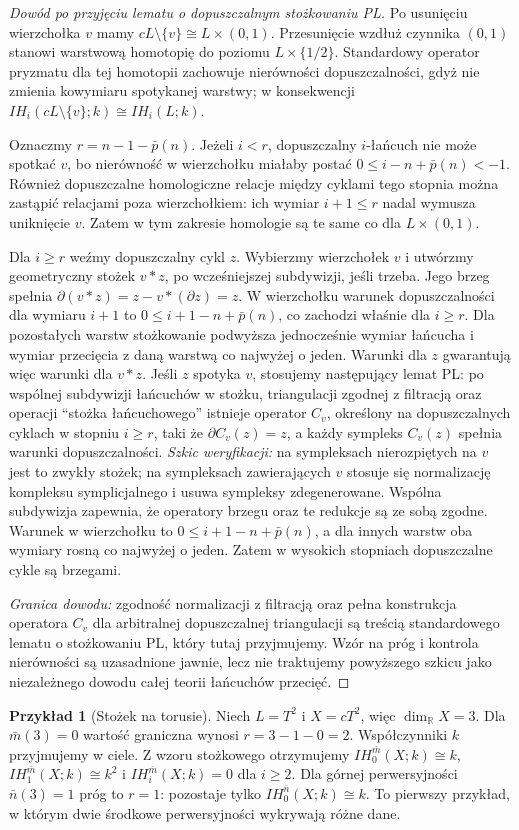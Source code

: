\documentclass[11pt,a4paper,oneside]{report}
\newcommand{\R}{\mathbb{R}}
\theoremstyle{plain}
\theoremstyle{definition}
\newtheorem{przyklad}[twierdzenie]{Przykład}
\theoremstyle{remark}
\begin{document}
\begin{proof}[Dowód po przyjęciu lematu o dopuszczalnym stożkowaniu PL]
Po usunięciu wierzchołka $v$ mamy
$cL\setminus\{v\}\cong L\times(0,1)$.
Przesunięcie wzdłuż czynnika $(0,1)$ stanowi
warstwową homotopię do poziomu $L\times\{1/2\}$.
Standardowy operator pryzmatu dla tej homotopii
zachowuje nierówności dopuszczalności, gdyż nie
zmienia kowymiaru spotykanej warstwy; w konsekwencji
$IH_i(cL\setminus\{v\};k)\cong IH_i(L;k)$.

Oznaczmy $r=n-1-\bar p(n)$.
Jeżeli $i<r$, dopuszczalny $i$-łańcuch nie może
spotkać $v$, bo nierówność w wierzchołku miałaby
postać $0\le i-n+\bar p(n)<-1$.
Również dopuszczalne homologiczne relacje między
cyklami tego stopnia można zastąpić relacjami poza
wierzchołkiem: ich wymiar $i+1\le r$ nadal wymusza
uniknięcie $v$. Zatem w tym zakresie homologie są
te same co dla $L\times(0,1)$.

Dla $i\ge r$ weźmy dopuszczalny cykl $z$.
Wybierzmy wierzchołek $v$ i utwórzmy geometryczny
stożek $v*z$, po wcześniejszej subdywizji, jeśli
trzeba. Jego brzeg spełnia
$\partial(v*z)=z-v*(\partial z)=z$.
W wierzchołku warunek dopuszczalności dla wymiaru
$i+1$ to $0\le i+1-n+\bar p(n)$, co zachodzi
właśnie dla $i\ge r$. Dla pozostałych warstw
stożkowanie podwyższa jednocześnie wymiar łańcucha
i wymiar przecięcia z daną warstwą co najwyżej
o jeden. Warunki dla $z$ gwarantują więc warunki
dla $v*z$. Jeśli $z$ spotyka $v$, stosujemy następujący
lemat PL: po wspólnej subdywizji łańcuchów w
stożku, triangulacji zgodnej z filtracją oraz
operacji ``stożka łańcuchowego'' istnieje operator
$C_v$, określony na dopuszczalnych cyklach w
stopniu $i\ge r$, taki że
$\partial C_v(z)=z$, a każdy sympleks $C_v(z)$
spełnia warunki dopuszczalności. \emph{Szkic weryfikacji:}
na sympleksach nierozpiętych na $v$ jest to zwykły
stożek; na sympleksach zawierających $v$ stosuje się
normalizację kompleksu symplicjalnego i usuwa
sympleksy zdegenerowane. Wspólna subdywizja
zapewnia, że operatory brzegu oraz te redukcje
są ze sobą zgodne. Warunek w wierzchołku to
$0\le i+1-n+\bar p(n)$, a dla innych warstw
oba wymiary rosną co najwyżej o jeden.
Zatem w wysokich stopniach dopuszczalne cykle
są brzegami.

\emph{Granica dowodu:} zgodność normalizacji z
filtracją oraz pełna konstrukcja operatora $C_v$
dla arbitralnej dopuszczalnej triangulacji są
treścią standardowego lematu o stożkowaniu PL,
który tutaj przyjmujemy. Wzór na próg i
kontrola nierówności są uzasadnione jawnie,
lecz nie traktujemy powyższego szkicu jako
niezależnego dowodu całej teorii łańcuchów
przecięć.
\end{proof}
\begin{przyklad}[Stożek na torusie]
\label{ex:torus-cone-xiii}
Niech $L=T^2$ i $X=cT^2$, więc $\dim_\R X=3$.
Dla $\bar m(3)=0$ wartość graniczna wynosi
$r=3-1-0=2$. Współczynniki $k$ przyjmujemy w ciele.
Z wzoru stożkowego otrzymujemy
$IH_0^{\bar m}(X;k)\cong k$,
$IH_1^{\bar m}(X;k)\cong k^2$ i
$IH_i^{\bar m}(X;k)=0$ dla $i\ge2$.
Dla górnej perwersyjności $\bar n(3)=1$ próg to $r=1$:
pozostaje tylko $IH_0^{\bar n}(X;k)\cong k$.
To pierwszy przykład, w którym dwie środkowe
perwersyjności wykrywają różne dane.
\end{przyklad}
\end{document}
